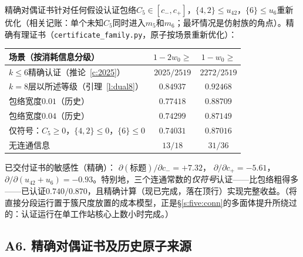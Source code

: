 \documentclass[11pt]{article}
\numberwithin{equation}{section}
\theoremstyle{definition}
\theoremstyle{remark}
\begin{document}
精确对偶证书针对任何假设认证包络$C_5\in[c_-,c_+]$，$\{4,2\}\le u_{42}$，$\{6\}\le u_6$重新优化（相关记账：单个未知$C_5$同时进入$m_5$和$m_6$；最坏情况是仿射族的角点）。精确有理证书（\texttt{certificate\_family.py}，原子按场景重新优化）：

\begin{center}
\begin{tabular}{lcc}
场景（按消耗信息分级） &
$1-2w_0\ge$ & $1-w_0\ge$\\
\hline
$k\le6$精确认证（推论~\ref{c:2025}） &
$2025/2519$ & $2272/2519$\\
$k=8$层以所述等级（引理~\ref{l:dual8}） &
$0.84937$ & $0.92468$\\
包络宽度$0.01$（历史） & $0.77418$ & $0.88709$\\
包络宽度$0.04$（历史） & $0.74299$ & $0.87149$\\
仅符号：$C_5\ge0$，$\{4,2\}\le0$，$\{6\}\le0$ &
$0.74031$ & $0.87016$\\
无连通信息 & $13/18$ & $31/36$\\
\end{tabular}
\end{center}

\noindent 已交付证书的敏感性（精确）：
$\partial(\text{标题})/\partial c_-=+7.32$，
$\partial/\partial c_+=-5.61$，
$\partial/\partial(u_{42}{+}u_6)=-0.93$。特别地，三个连通常数的\emph{仅符号}认证——比包络粗得多——已认证$0.740/0.870$，且精确计算（现已完成，落在顶行）实现完整收益。（将直接分段运行置于簇尺度放置的成本模型，正是\S\ref{s:five:conn}的多面体提升所绕过的：认证运行在单工作站核心上数小时完成。）

\subsection*{A6. 精确对偶证书及历史原子来源}
\end{document}
